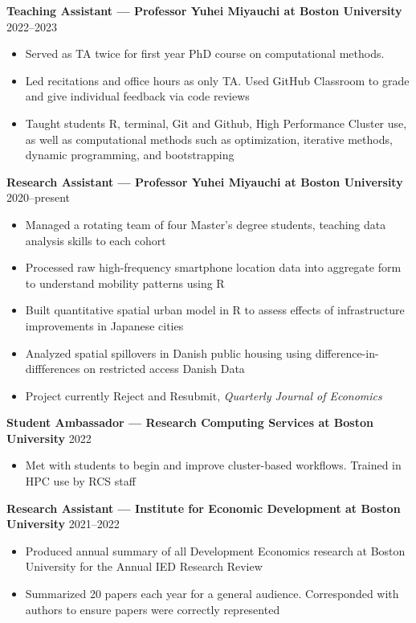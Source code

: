\documentclass[10pt]{article}
\newenvironment{customitemize}
{ \begin{itemize}[leftmargin=\parindent, topsep = 0.2pt, itemsep = -3pt] }
{\end{itemize} }
\begin{document}
\noindent \textbf{Teaching Assistant --- Professor Yuhei Miyauchi at Boston University}  \hfill 2022--2023
\begin{customitemize}
	\item Served as TA twice for first year PhD course on computational methods. 
	\item Led recitations and office hours as only TA. Used GitHub Classroom to grade and give individual feedback via code reviews
	\item Taught students R, terminal, Git and Github, High Performance Cluster use, as well as computational methods such as optimization, iterative methods, dynamic programming, and bootstrapping 
\end{customitemize}

\noindent \textbf{Research Assistant --- Professor Yuhei Miyauchi at Boston University}  \hfill 2020--present 
\begin{customitemize}
	\item Managed a rotating team of four Master's degree students, teaching data analysis skills to each cohort
	\item Processed raw high-frequency smartphone location data into aggregate form to understand mobility patterns using R
	\item Built quantitative spatial urban model in R to assess effects of infrastructure improvements in Japanese cities
	\item Analyzed spatial spillovers in Danish public housing using difference-in-diffferences on restricted access Danish Data
	\item Project currently Reject and Resubmit, \textit{Quarterly Journal of Economics}
\end{customitemize}

\noindent \textbf{Student Ambassador --- Research Computing Services at Boston University}  \hfill 2022
\begin{customitemize}
	\item Met with students to begin and improve cluster-based workflows. Trained in HPC use by RCS staff
\end{customitemize}

\noindent \textbf{Research Assistant --- Institute for Economic Development at Boston University}  \hfill 2021--2022
\begin{customitemize}
	\item Produced annual summary of all Development Economics research at Boston University for the Annual IED Research Review
	\item Summarized 20 papers each year for a general audience. Corresponded with authors to ensure papers were correctly represented
\end{customitemize}
\end{document}
